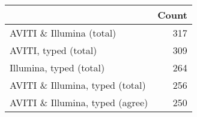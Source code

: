 \begin{tabular}{lr}
\toprule
 & Count \\
\midrule
AVITI \& Illumina (total) & 317 \\
AVITI, typed (total) & 309 \\
Illumina, typed (total) & 264 \\
AVITI \& Illumina, typed (total) & 256 \\
AVITI \& Illumina, typed (agree) & 250 \\
\bottomrule
\end{tabular}
